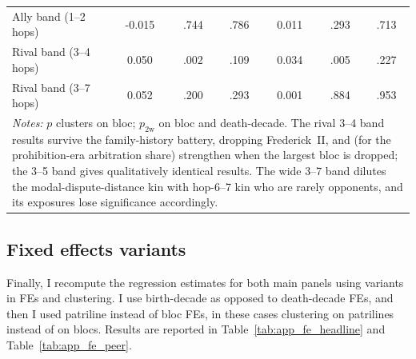 \documentclass[12pt]{article}
\theoremstyle{definition}
\theoremstyle{remark}
\begin{document}
\begin{table}[t]
{\begin{tabular}{lcccccc}
Ally band (1--2 hops) & -0.015 & .744 & .786 & 0.011 & .293 & .713 \\
Rival band (3--4 hops) & 0.050 & .002 & .109 & 0.034 & .005 & .227 \\
Rival band (3--7 hops) & 0.052 & .200 & .293 & 0.001 & .884 & .953 \\
\midrule
\multicolumn{7}{p{0.92\textwidth}}{\footnotesize \textit{Notes:} $p$ clusters on bloc; $p_{\text{2w}}$ on bloc and death-decade. The rival 3--4 band results survive the family-history battery, dropping Frederick~II, and (for the prohibition-era arbitration share) strengthen when the largest bloc is dropped; the 3--5 band gives qualitatively identical results. The wide 3--7 band dilutes the modal-dispute-distance kin with hop-6--7 kin who are rarely opponents, and its exposures lose significance accordingly.} \\
\bottomrule
\end{tabular}
}
\end{table}

\subsection{Fixed effects variants}
\label{app:FEs}

Finally, I recompute the regression estimates for both main panels using variants in FEs and clustering. I use birth-decade as opposed to death-decade FEs, and then I used patriline instead of bloc FEs, in these cases clustering on patrilines instead of on blocs. Results are reported in Table~\ref{tab:app_fe_headline} and Table~\ref{tab:app_fe_peer}.
\end{document}
